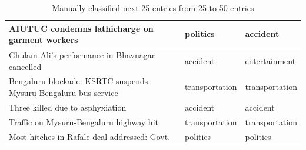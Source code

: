 \begin{table}
\begin{tabular}{ | p{5.4cm}| p{2.0cm} | p{2.0cm} | }
\hline
AIUTUC condemns lathicharge on garment workers & politics  & accident  \\
\hline
Ghulam Ali’s performance in Bhavnagar cancelled & accident  & entertainment \\
\hline
Bengaluru blockade: KSRTC suspends Mysuru-Bengaluru bus service & transportation  & transportation  \\
\hline
Three killed due to asphyxiation & accident  & accident  \\
\hline
Traffic on Mysuru-Bengaluru highway hit & transportation  & transportation  \\
\hline
Most hitches in Rafale deal addressed: Govt. & politics  & politics  \\
\hline
\end{tabular}
\caption{Manually classified next 25 entries from 25 to 50 entries }
\label{table:ql2-2}
\end{table}
\newpage

